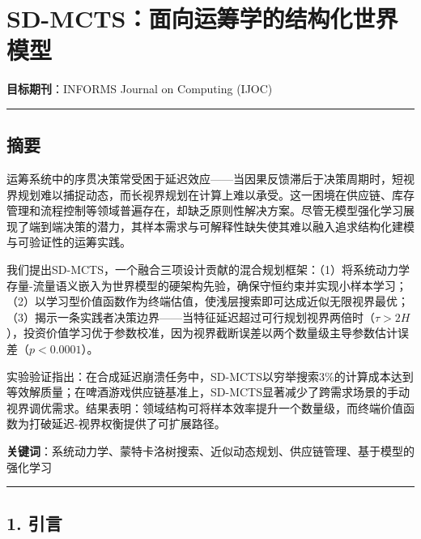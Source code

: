 \documentclass[UTF8]{ctexart}
\date{}
\begin{document}
\hypertarget{sd-mctsux9762ux5411ux8fd0ux7b79ux5b66ux7684ux7ed3ux6784ux5316ux4e16ux754cux6a21ux578b}{%
\section{SD-MCTS：面向运筹学的结构化世界模型}\label{sd-mctsux9762ux5411ux8fd0ux7b79ux5b66ux7684ux7ed3ux6784ux5316ux4e16ux754cux6a21ux578b}}

\textbf{目标期刊}：INFORMS Journal on Computing (IJOC)

\begin{center}\rule{0.5\linewidth}{0.4pt}\end{center}

\hypertarget{ux6458ux8981}{%
\subsection{摘要}\label{ux6458ux8981}}

运筹系统中的序贯决策常受困于延迟效应------当因果反馈滞后于决策周期时，短视界规划难以捕捉动态，而长视界规划在计算上难以承受。这一困境在供应链、库存管理和流程控制等领域普遍存在，却缺乏原则性解决方案。尽管无模型强化学习展现了端到端决策的潜力，其样本需求与可解释性缺失使其难以融入追求结构化建模与可验证性的运筹实践。

我们提出SD-MCTS，一个融合三项设计贡献的混合规划框架：（1）将系统动力学存量-流量语义嵌入为世界模型的硬架构先验，确保守恒约束并实现小样本学习；（2）以学习型价值函数作为终端估值，使浅层搜索即可达成近似无限视界最优；（3）揭示一条实践者决策边界------当特征延迟超过可行规划视界两倍时（\(\tau > 2H\)），投资价值学习优于参数校准，因为视界截断误差以两个数量级主导参数估计误差（\(p < 0.0001\)）。

实验验证指出：在合成延迟崩溃任务中，SD-MCTS以穷举搜索3\%的计算成本达到等效解质量；在啤酒游戏供应链基准上，SD-MCTS显著减少了跨需求场景的手动视界调优需求。结果表明：领域结构可将样本效率提升一个数量级，而终端价值函数为打破延迟-视界权衡提供了可扩展路径。

\textbf{关键词}：系统动力学、蒙特卡洛树搜索、近似动态规划、供应链管理、基于模型的强化学习

\begin{center}\rule{0.5\linewidth}{0.4pt}\end{center}

\hypertarget{ux5f15ux8a00}{%
\subsection{1. 引言}\label{ux5f15ux8a00}}
\end{document}
